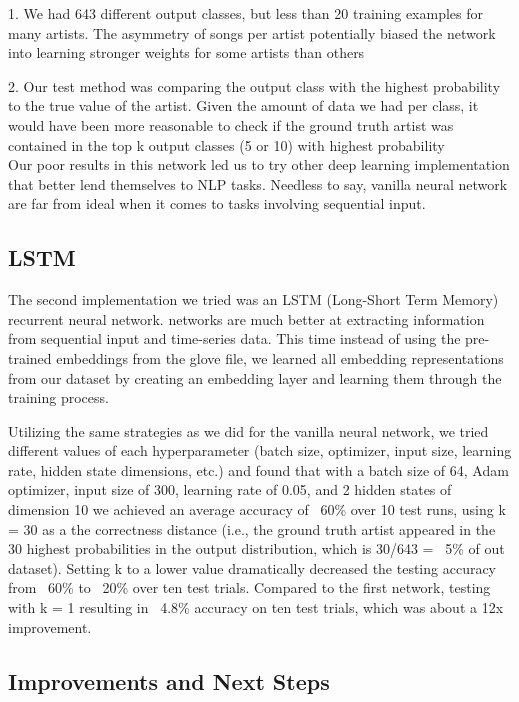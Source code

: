 \documentclass[11pt,a4paper]{article}
\begin{document}
1. We had 643 different output classes, but less than 20 training examples for many artists. The asymmetry of songs per artist potentially biased the network into learning stronger weights for some artists than others

2. Our test method was comparing the output class with the highest probability to the true value of the artist. Given the amount of data we had per class, it would have been more reasonable to check if the ground truth artist was contained in the top k output classes (5 or 10) with highest probability
\\ 

Our poor results in this network led us to try other deep learning implementation that better lend themselves to NLP tasks. Needless to say, vanilla neural network are far from ideal when it comes to tasks involving sequential input.

\subsection{LSTM}   

The second implementation we tried was an LSTM (Long-Short Term Memory) recurrent neural network.  networks are much better at extracting information from sequential input and time-series data. This time instead of using the pre-trained embeddings from the glove file, we learned all embedding representations from our dataset by creating an embedding layer and learning them through the training process.

Utilizing the same strategies as we did for the vanilla neural network, we tried different values of each hyperparameter (batch size, optimizer, input size, learning rate, hidden state dimensions, etc.) and found that with a batch size of 64, Adam optimizer, input size of 300, learning rate of 0.05, and 2 hidden states of dimension 10 we achieved an average accuracy of ~60\% over 10 test runs, using k = 30 as a the correctness distance (i.e., the ground truth artist appeared in the 30 highest probabilities in the output distribution, which is 30/643 = ~5\% of out dataset). Setting k to a lower value dramatically decreased the testing accuracy from ~60\% to ~20\% over ten test trials. Compared to the first network, testing with k = 1 resulting in ~4.8\% accuracy on ten test trials, which was about a 12x improvement.

\subsection{Improvements and Next Steps}
\end{document}
